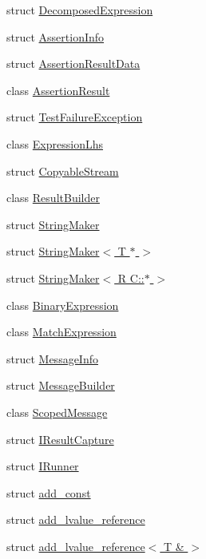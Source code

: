 \begin{DoxyCompactItemize}
\item 
struct \hyperlink{struct_catch_1_1_decomposed_expression}{Decomposed\-Expression}
\item 
struct \hyperlink{struct_catch_1_1_assertion_info}{Assertion\-Info}
\item 
struct \hyperlink{struct_catch_1_1_assertion_result_data}{Assertion\-Result\-Data}
\item 
class \hyperlink{class_catch_1_1_assertion_result}{Assertion\-Result}
\item 
struct \hyperlink{struct_catch_1_1_test_failure_exception}{Test\-Failure\-Exception}
\item 
class \hyperlink{class_catch_1_1_expression_lhs}{Expression\-Lhs}
\item 
struct \hyperlink{struct_catch_1_1_copyable_stream}{Copyable\-Stream}
\item 
class \hyperlink{class_catch_1_1_result_builder}{Result\-Builder}
\item 
struct \hyperlink{struct_catch_1_1_string_maker}{String\-Maker}
\item 
struct \hyperlink{struct_catch_1_1_string_maker_3_01_t_01_5_01_4}{String\-Maker$<$ T $\ast$ $>$}
\item 
struct \hyperlink{struct_catch_1_1_string_maker_3_01_r_01_c_1_1_5_01_4}{String\-Maker$<$ R C\-::$\ast$ $>$}
\item 
class \hyperlink{class_catch_1_1_binary_expression}{Binary\-Expression}
\item 
class \hyperlink{class_catch_1_1_match_expression}{Match\-Expression}
\item 
struct \hyperlink{struct_catch_1_1_message_info}{Message\-Info}
\item 
struct \hyperlink{struct_catch_1_1_message_builder}{Message\-Builder}
\item 
class \hyperlink{class_catch_1_1_scoped_message}{Scoped\-Message}
\item 
struct \hyperlink{struct_catch_1_1_i_result_capture}{I\-Result\-Capture}
\item 
struct \hyperlink{struct_catch_1_1_i_runner}{I\-Runner}
\item 
struct \hyperlink{struct_catch_1_1add__const}{add\-\_\-const}
\item 
struct \hyperlink{struct_catch_1_1add__lvalue__reference}{add\-\_\-lvalue\-\_\-reference}
\item 
struct \hyperlink{struct_catch_1_1add__lvalue__reference_3_01_t_01_6_01_4}{add\-\_\-lvalue\-\_\-reference$<$ T \& $>$}
\item 

\end{DoxyCompactItemize}
